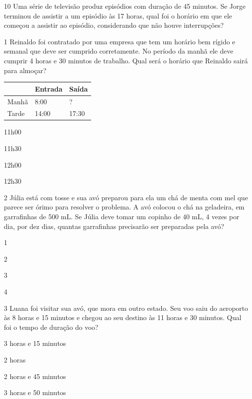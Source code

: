 \num{10} Uma série de televisão produz episódios com duração de 45 minutos.
Se Jorge terminou de assistir a um episódio às 17 horas, qual foi o
horário em que ele começou a assistir ao episódio, considerando que não houve interrupções?


\pagebreak
{}

\num{1} Reinaldo foi contratado por uma empresa que tem um horário bem rígido
e semanal que deve ser cumprido corretamente. No período da manhã ele deve
cumprir 4 horas e 30 minutos de trabalho. Qual será o horário que
Reinaldo sairá para almoçar?

\begin{longtable}[]{@{}lll@{}}
\toprule
& Entrada & Saída\tabularnewline
\midrule
\endhead
Manhã & 8:00 & ?\tabularnewline
Tarde & 14:00 & 17:30\tabularnewline
\bottomrule
\end{longtable}

\begin{escolha}
\item
  11h00
\item
  11h30
\item
  12h00
\item
  12h30
\end{escolha}


\num{2} Júlia está com tosse e sua avó preparou para ela um chá de menta com mel que parece ser órimo para resolver o problema. A avó colocou o chá na geladeira, em garrafinhas de 500 mL. Se Júlia deve tomar um copinho de 40 mL, 4 vezes por dia, por dez dias, quantas garrafinhas precisarão ser preparadas pela avó?

\begin{escolha}

\item
  1
\item
  2
\item
  3
\item
  4
\end{escolha}


\num{3} Luana foi visitar sua avó, que mora em outro estado. Seu voo
saiu do aeroporto às 8 horas e 15 minutos e chegou ao seu destino às 11
horas e 30 minutos. Qual foi o tempo de duração do voo?

\begin{escolha}
\item
  3 horas e 15 minutos
\item
  2 horas 
\item
  2 horas e 45 minutos
\item
  3 horas e 50 minutos
\end{escolha}


